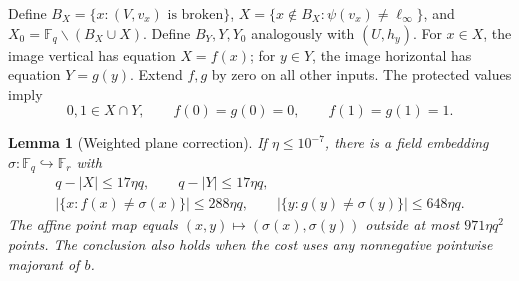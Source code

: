 \documentclass[11pt]{article}
\newtheorem{lemma}[theorem]{Lemma}
\newcommand{\F}{\mathbb F}
\begin{document}
Define $B_X=\{x:(V,v_x)\text{ is broken}\}$,
$X=\{x\notin B_X:\psi(v_x)\ne\ell_\infty\}$, and
$X_0=\F_q\smallsetminus(B_X\cup X)$. Define $B_Y,Y,Y_0$ analogously with
$(U,h_y)$. For $x\in X$, the image vertical has equation $X=f(x)$;
for $y\in Y$, the image horizontal has equation $Y=g(y)$. Extend $f,g$
by zero on all other inputs. The protected values imply
\begin{equation}\label{protectedvalues}
 0,1\in X\cap Y,\qquad f(0)=g(0)=0,\qquad f(1)=g(1)=1.
\end{equation}
\begin{lemma}[Weighted plane correction]\label{planelemma}
If $\eta\leq10^{-7}$, there is a field embedding
$\sigma:\F_q\hookrightarrow\F_r$ with
\[
\begin{gathered}
 q-|X|\leq17\eta q,\qquad q-|Y|\leq17\eta q,\\
 |\{x:f(x)\ne\sigma(x)\}|\leq288\eta q,\qquad
 |\{y:g(y)\ne\sigma(y)\}|\leq648\eta q.
\end{gathered}
\]
The affine point map equals $(x,y)\mapsto(\sigma(x),\sigma(y))$ outside
at most $971\eta q^2$ points. The conclusion also holds when the cost
uses any nonnegative pointwise majorant of $b$.
\end{lemma}
\end{document}
